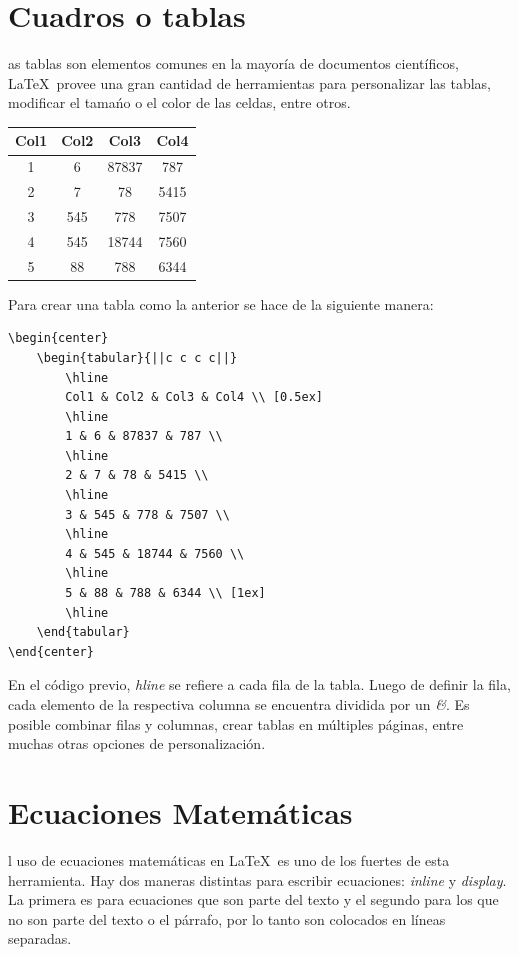 \documentclass[10pt,journal,compsoc]{IEEEtran}
\begin{document}
\section{Cuadros o tablas}
as tablas son elementos comunes en la mayor\'ia de documentos cient\'ificos, \LaTeX\ provee una gran cantidad de herramientas para personalizar las tablas, modificar el tama\'no o el color de las celdas, entre otros. 

\begin{center}
	\begin{tabular}{||c c c c||} 
		\hline
		Col1 & Col2 & Col3 & Col4 \\ [0.5ex] 
		\hline
		1 & 6 & 87837 & 787 \\ 
		\hline
		2 & 7 & 78 & 5415 \\
		\hline
		3 & 545 & 778 & 7507 \\
		\hline
		4 & 545 & 18744 & 7560 \\
		\hline
		5 & 88 & 788 & 6344 \\ [1ex] 
		\hline
	\end{tabular}
\end{center}

Para crear una tabla como la anterior se hace de la siguiente manera:
	\begin{lstlisting}
\begin{center}
	\begin{tabular}{||c c c c||} 
		\hline
		Col1 & Col2 & Col3 & Col4 \\ [0.5ex] 
		\hline
		1 & 6 & 87837 & 787 \\ 
		\hline
		2 & 7 & 78 & 5415 \\
		\hline
		3 & 545 & 778 & 7507 \\
		\hline
		4 & 545 & 18744 & 7560 \\
		\hline
		5 & 88 & 788 & 6344 \\ [1ex] 
		\hline
	\end{tabular}
\end{center}
	\end{lstlisting}
En el c\'odigo previo, \emph{hline} se refiere a cada fila de la tabla. Luego de definir la fila, cada elemento de la respectiva columna se encuentra dividida por un \emph{\&}. Es posible combinar filas y columnas, crear tablas en m\'ultiples p\'aginas, entre muchas otras opciones de personalizaci\'on.

\section{Ecuaciones Matem\'aticas}
l uso de ecuaciones matem\'aticas en \LaTeX\ es uno de los fuertes de esta herramienta. Hay dos maneras distintas para escribir ecuaciones: \emph{inline} y \emph{display}. La primera es para ecuaciones que son parte del texto y el segundo para los que no son parte del texto o el p\'arrafo, por lo tanto son colocados en l\'ineas separadas.
\end{document}
